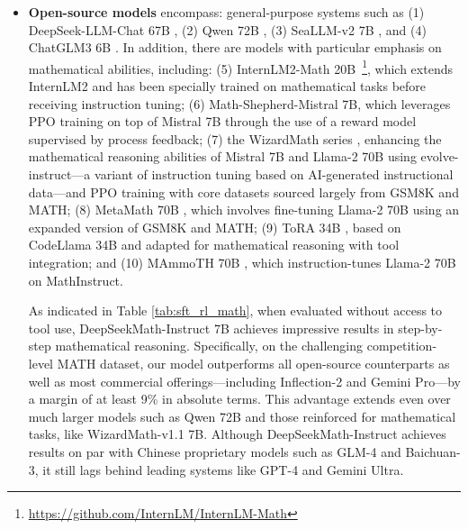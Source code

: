 \begin{itemize}[topsep=0pt]
\begin{itemize}[topsep=0pt]
    \item \textbf{Closed-source models} encompass: (1) the GPT series, with GPT-4 \citep{gpt4} and GPT-4 Code Interpreter~\footnote{\url{https://openai.com/blog/chatgpt-plugins\#\#code-interpreter}} standing out as the most advanced, (2) Gemini Ultra and Pro \citep{gemini}, (3) Inflection-2 \citep{inflection-2}, (4) Grok-1~\footnote{\url{https://x.ai/model-card}}, together with several recent offerings from Chinese developers such as (5) Baichuan-3~\footnote{\url{https://www.baichuan-ai.com}}, and (6) the new GLM-4~\footnote{\url{https://open.bigmodel.cn/dev/api\#glm-4}} from the GLM model series \citep{glm}.
\end{itemize}

The models presented here are designed for general applications and, for the most part, have been subjected to various alignment processes.
    \item \textbf{Open-source models} encompass: general-purpose systems such as (1) DeepSeek-LLM-Chat 67B \citep{deepseek-llm}, (2) Qwen 72B \citep{qwen}, (3) SeaLLM-v2 7B \citep{seallm}, and (4) ChatGLM3 6B \citep{chatglm3}. In addition, there are models with particular emphasis on mathematical abilities, including: (5) InternLM2-Math 20B~\footnote{\url{https://github.com/InternLM/InternLM-Math}}, which extends InternLM2 and has been specially trained on mathematical tasks before receiving instruction tuning; (6) Math-Shepherd-Mistral 7B, which leverages PPO training \citep{schulman2017proximal} on top of Mistral 7B \citep{mistral} through the use of a reward model supervised by process feedback; (7) the WizardMath series \citep{wizardmath}, enhancing the mathematical reasoning abilities of Mistral 7B and Llama-2 70B \citep{llama2} using evolve-instruct—a variant of instruction tuning based on AI-generated instructional data—and PPO training with core datasets sourced largely from GSM8K and MATH; (8) MetaMath 70B \citep{metamath}, which involves fine-tuning Llama-2 70B using an expanded version of GSM8K and MATH; (9) ToRA 34B \cite{tora}, based on CodeLlama 34B and adapted for mathematical reasoning with tool integration; and (10) MAmmoTH 70B \citep{MathInstruct}, which instruction-tunes Llama-2 70B on MathInstruct.

As indicated in Table \ref{tab:sft_rl_math}, when evaluated without access to tool use, DeepSeekMath-Instruct 7B achieves impressive results in step-by-step mathematical reasoning. Specifically, on the challenging competition-level MATH dataset, our model outperforms all open-source counterparts as well as most commercial offerings—including Inflection-2 and Gemini Pro—by a margin of at least 9\% in absolute terms. This advantage extends even over much larger models such as Qwen 72B and those reinforced for mathematical tasks, like WizardMath-v1.1 7B. Although DeepSeekMath-Instruct achieves results on par with Chinese proprietary models such as GLM-4 and Baichuan-3, it still lags behind leading systems like GPT-4 and Gemini Ultra.


\end{itemize}
